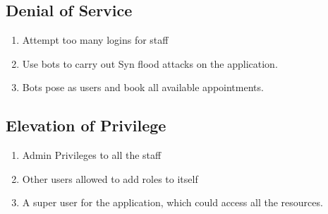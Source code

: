 \subsection{Denial of Service}
\begin{enumerate}
    \item Attempt too many logins for staff
    \item Use bots to carry out Syn flood attacks on the application.
    \item Bots pose as users and book all available appointments.
\end{enumerate}

\subsection{Elevation of Privilege}
\begin{enumerate}
    \item Admin Privileges to all the staff
    \item Other users allowed to add roles to itself
    \item A super user for the application, which could access all the resources.
\end{enumerate}
